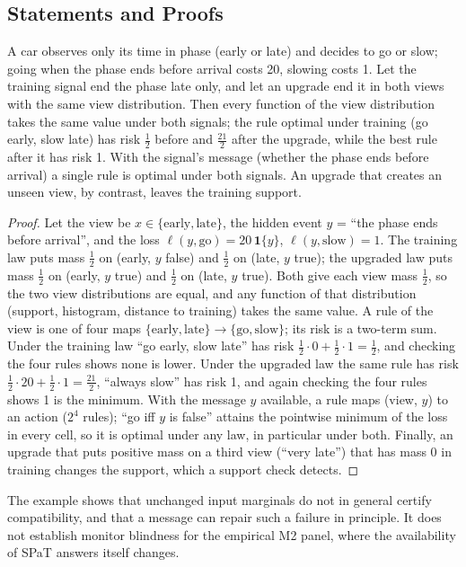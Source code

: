 \subsection{Statements and Proofs}
\begin{theorem}\label{thm:blind}
A car observes only its time in phase (early or late) and decides to go or slow; going when the phase ends before arrival costs 20, slowing
costs 1. Let the training signal end the phase late only, and let an upgrade end it in both views with the same view distribution. Then
every function of the view distribution takes the same value under both signals; the rule optimal under training (go early, slow late) has
risk $\tfrac12$ before and $\tfrac{21}{2}$ after the upgrade, while the best rule after it has risk 1. With the signal's message (whether the
phase ends before arrival) a single rule is optimal under both signals. An upgrade that creates an unseen view, by contrast, leaves the
training support.
\end{theorem}
\begin{proof}
Let the view be $x\in\{\text{early},\text{late}\}$, the hidden event $y$ = ``the phase ends before arrival'', and the loss
$\ell(y,\text{go})=20\,\mathbf{1}\{y\}$, $\ell(y,\text{slow})=1$. The training law puts mass $\tfrac12$ on (early, $y$ false) and $\tfrac12$
on (late, $y$ true); the upgraded law puts mass $\tfrac12$ on (early, $y$ true) and $\tfrac12$ on (late, $y$ true). Both give each view
mass $\tfrac12$, so the two view distributions are equal, and any function of that distribution (support, histogram, distance to
training) takes the same value. A rule of the view is one of four maps $\{\text{early},\text{late}\}\to\{\text{go},\text{slow}\}$; its risk
is a two-term sum. Under the training law ``go early, slow late'' has risk $\tfrac12\cdot0+\tfrac12\cdot1=\tfrac12$, and checking the four
rules shows none is lower. Under the upgraded law the same rule has risk $\tfrac12\cdot20+\tfrac12\cdot1=\tfrac{21}{2}$, ``always slow''
has risk 1, and again checking the four rules shows 1 is the minimum. With the message $y$ available, a rule maps (view, $y$) to an
action ($2^4$ rules); ``go iff $y$ is false'' attains the pointwise minimum of the loss in every cell, so it is optimal under any law, in
particular under both. Finally, an upgrade that puts positive mass on a third view (``very late'') that has mass 0 in training changes the
support, which a support check detects.
\end{proof}
The example shows that unchanged input marginals do not in general certify compatibility, and that a message can repair such a failure
in principle. It does not establish monitor blindness for the empirical M2 panel, where the availability of SPaT answers itself changes.

